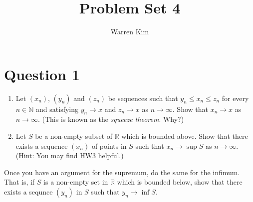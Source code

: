 \documentclass[13pt]{article}
\title{Problem Set 4}
\author{Warren Kim}
\begin{document}
\maketitle

\newpage
\section*{Question 1}
\begin{enumerate}[label=(\alph*)]
\item Let $(x_n)$, $(y_n)$ and $(z_n)$ be sequences such that $y_n
  \leq x_n \leq z_n$ for every $n \in \mathbb{N}$ and satisfying $y_n
  \rightarrow x$ and $z_n \rightarrow x$ as $n \rightarrow
  \infty$. Show that $x_n \rightarrow x$ as $n \rightarrow
  \infty$. (This is known as the \textit{squeeze theorem}. Why?)

\item Let $S$ be a non-empty subset of $\mathbb{R}$ which is bounded
  above. Show that there exists a sequence $(x_n)$ of points in $S$
  such that $x_n \rightarrow \sup{S}$ as $n \rightarrow \infty$. \\
  (Hint: You may find HW3 helpful.)
\end{enumerate}
Once you have an argument for the supremum, do the same for the
infimum. That is, if $S$ is a non-empty set in $\mathbb{R}$ which is
bounded below, show that there exists a sequnce $(y_n)$ in $S$ such
that $y_n \rightarrow \inf{S}$.
\end{document}
